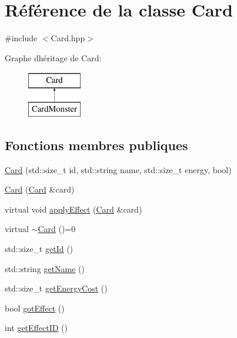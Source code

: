 \hypertarget{classCard}{}\section{Référence de la classe Card}
\label{classCard}


{\ttfamily \#include $<$Card.\+hpp$>$}

Graphe d\textquotesingle{}héritage de Card\+:\begin{figure}[H]
\begin{center}
\leavevmode
\includegraphics[height=2.000000cm]{classCard}
\end{center}
\end{figure}
\subsection*{Fonctions membres publiques}
\begin{DoxyCompactItemize}
\item 
\hyperlink{classCard_adacf4b8bbaa2a417e458b70c99019a39}{Card} (std\+::size\+\_\+t id, std\+::string name, std\+::size\+\_\+t energy, bool)
\item 
\hyperlink{classCard_a88211ebea56b896a7f43b8aa600cb74e}{Card} (\hyperlink{classCard}{Card} \&card)
\item 
virtual void \hyperlink{classCard_a85e099caac46055618988d81a5001708}{apply\+Effect} (\hyperlink{classCard}{Card} \&card)
\item 
virtual \hyperlink{classCard_abf30649dca6b7398b7500e41fd6767e0}{$\sim$\+Card} ()=0
\item 
std\+::size\+\_\+t \hyperlink{classCard_a6eec742565ded028a7f2737c53ae4507}{get\+Id} ()
\item 
std\+::string \hyperlink{classCard_ad060fe107bfaf4741c671615885b314a}{get\+Name} ()
\item 
std\+::size\+\_\+t \hyperlink{classCard_a56f0050aa1cbc799b4481431163f5a90}{get\+Energy\+Cost} ()
\item 
bool \hyperlink{classCard_a9932401135454db169e1e4d678103917}{got\+Effect} ()
\item 
int \hyperlink{classCard_a6f6c3220c269eef98fe84ffbcffd9371}{get\+Effect\+I\+D} ()
\end{DoxyCompactItemize}


